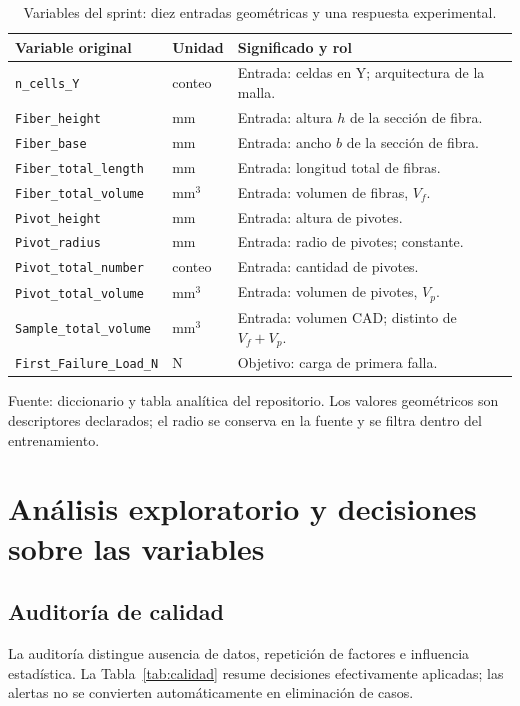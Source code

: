 \begin{table}[htbp]
\centering\small{}
\caption{Variables del sprint: diez entradas geométricas y una respuesta experimental.}
\label{tab:entradas}
\begin{tabularx}{\linewidth}{@{}l l X@{}}
\toprule
Variable original & Unidad & Significado y rol \\
\midrule
\texttt{n\_cells\_Y} & conteo & Entrada: celdas en Y; arquitectura de la malla. \\
\texttt{Fiber\_height} & mm & Entrada: altura $h$ de la sección de fibra. \\
\texttt{Fiber\_base} & mm & Entrada: ancho $b$ de la sección de fibra. \\
\texttt{Fiber\_total\_length} & mm & Entrada: longitud total de fibras. \\
\texttt{Fiber\_total\_volume} & mm$^3$ & Entrada: volumen de fibras, $V_f$. \\
\texttt{Pivot\_height} & mm & Entrada: altura de pivotes. \\
\texttt{Pivot\_radius} & mm & Entrada: radio de pivotes; constante. \\
\texttt{Pivot\_total\_number} & conteo & Entrada: cantidad de pivotes. \\
\texttt{Pivot\_total\_volume} & mm$^3$ & Entrada: volumen de pivotes, $V_p$. \\
\texttt{Sample\_total\_volume} & mm$^3$ & Entrada: volumen CAD; distinto de $V_f+V_p$. \\
\texttt{First\_Failure\_Load\_N} & N & Objetivo: carga de primera falla. \\
\bottomrule
\end{tabularx}
\par\smallskip\small Fuente: diccionario y tabla analítica del repositorio. Los valores geométricos son descriptores declarados; el radio se conserva en la fuente y se filtra dentro del entrenamiento.
\end{table}

\section{Análisis exploratorio y decisiones sobre las variables}
\label{sec:eda}

\subsection{Auditoría de calidad}
La auditoría distingue ausencia de datos, repetición de factores e influencia estadística. La Tabla~\ref{tab:calidad} resume decisiones efectivamente aplicadas; las alertas no se convierten automáticamente en eliminación de casos.

